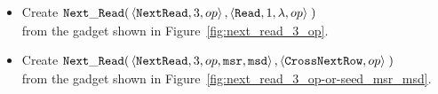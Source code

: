 \begin{itemize}
    \item Create
    $\begin{aligned}[t]
        {\tt Next\_Read}(& \left\langle {\tt NextRead}, 3,          op \right\rangle,
                    \left\langle {\tt Read},     1, \lambda, op \right\rangle \;)
    \end{aligned}$\\from the gadget shown in Figure~\ref{fig:next_read_3_op}.

    \item Create
    $\begin{aligned}[t]
        {\tt Next\_Read}(& \left\langle {\tt NextRead}, 3,  op, {\tt msr}, {\tt msd} \right\rangle,
                    \left\langle {\tt CrossNextRow}, op \right\rangle \;)
    \end{aligned}$\\from the gadget shown in Figure~\ref{fig:next_read_3_op-or-seed_msr_msd}.
\end{itemize}

